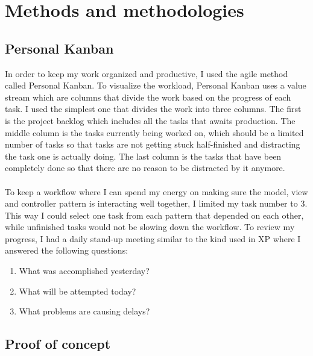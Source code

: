 
\chapter{Methods and methodologies} %

\label{Chapter2} %


\section{Personal Kanban}
In order to keep my work organized and productive, I used the agile method called Personal Kanban. To visualize the workload, Personal Kanban uses a value stream which are columns that divide the work based on the progress of each task. I used the simplest one that divides the work into three columns. The first is the project backlog which includes all the tasks that awaits production. The middle column is the tasks currently being worked on, which should be a limited number of tasks so that tasks are not getting stuck half-finished and distracting the task one is actually doing. The last column is the tasks that have been completely done so that there are no reason to be distracted by it anymore. \parencite{Reference1}
\\\\
To keep a workflow where I can spend my energy on making sure the model, view and controller pattern is interacting well together, I limited my task number to 3. This way I could select one task from each pattern that depended on each other, while unfinished tasks would not be slowing down the workflow.
To review my progress, I had a daily stand-up meeting similar to the kind used in XP \parencite{Reference2} where I answered the following questions:
\begin{enumerate}
\item What was accomplished yesterday?
\item What will be attempted today?
\item What problems are causing delays?
\end{enumerate}



\section{Proof of concept}

